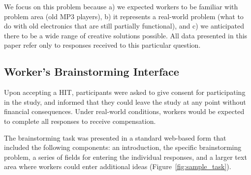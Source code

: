 
We focus on this problem because a) we expected workers to be familiar with problem area (old MP3 players), b) it represents a real-world problem (what to do with old electronics that are still partially functional), and c) we anticipated there to be a wide range of creative solutions possible. All data presented in this paper refer only to responses received to this particular question.


\subsection{Worker's Brainstorming Interface}

Upon accepting a HIT, participants were asked to give consent for participating in the study, and informed that they could leave the study at any point without financial consequences. Under real-world conditions, workers would be expected to complete all responses to receive compensation.

The brainstorming task was presented in a standard web-based form that included the following components: an introduction, the specific brainstorming problem, a series of fields for entering the individual responses, and a larger text area where workers could enter additional ideas (Figure~\ref{fig:sample_task}).

